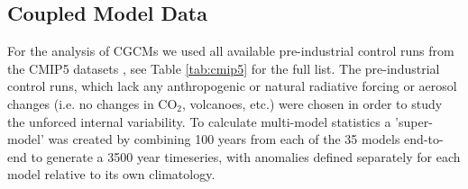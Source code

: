 \subsection{Coupled Model Data}

For the analysis of CGCMs we used all available pre-industrial control runs from 
the CMIP5 datasets \citep{Taylor2012}, see Table \ref{tab:cmip5} for the full 
list. The pre-industrial control runs, which lack any anthropogenic or natural 
radiative forcing or aerosol changes (i.e. no changes in CO$_2$, volcanoes, etc.)  
were chosen in order to study the unforced internal variability. To calculate 
multi-model statistics a 'super-model' was created by combining 100 years from 
each of the 35 models end-to-end to generate a 3500 year timeseries, with 
anomalies defined separately for each model relative to its own climatology.  


